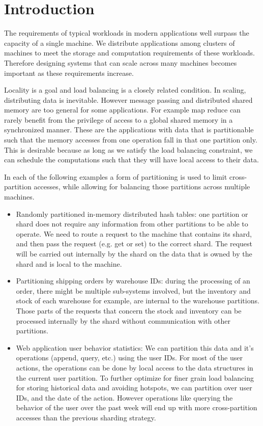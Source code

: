 \chapter{Introduction}
\label{chap:introduction}

The requirements of typical workloads in modern applications well surpass the
capacity of a single machine. We distribute applications among clusters of
machines to
meet the storage and computation requirements of these workloads. Therefore
designing systems that can scale across many machines becomes important as
these requirements increase.

Locality is a goal and load balancing is a closely related condition.
In scaling, distributing data is inevitable. However message passing and
distributed shared memory are too general for some applications. For example
map reduce can rarely benefit from the privilege of access to a global
shared memory in a synchronized manner. These are the applications with
data that is partitionable such that the memory accesses from one operation
fall in that one partition only. This is desirable because as long as we
satisfy the load balancing constraint, we can schedule the computations
such that they will have local access to their data.

In each of the following examples a form of partitioning is used to limit
cross-partition accesses, while allowing for balancing those partitions across
multiple machines.

\begin{itemize}
    \item Randomly partitioned in-memory distributed hash tables: one partition or shard
    does not require any information from other partitions to be able to
    operate. We need to route a request to the machine that contains its shard,
    and then pass the request (e.g. get or set) to the correct shard. The
    request will be carried out internally by the shard on the data that
    is owned by the shard and is local to the machine.

    \item Partitioning shipping orders by warehouse IDs: during the
    processing of an order, there might be multiple sub-systems involved,
    but the inventory and stock of each warehouse for example, are internal to
    the warehouse partitions. Those parts of the requests that concern the
    stock and inventory can be processed internally by the shard without
    communication with other partitions.

    \item Web application user behavior statistics: We can partition this data
    and it's operations (append, query, etc.) using the user IDs. For most of
    the user actions, the operations can be done by local access to the
    data structures in the current user partition. To further optimize for
    finer grain load balancing for storing historical data and avoiding
    hotspots, we can partition over user IDs, and the date of the action.
    However operations like querying the behavior of the user over the past
    week will end up with more cross-partition accesses than the previous
    sharding strategy.
\end{itemize}

